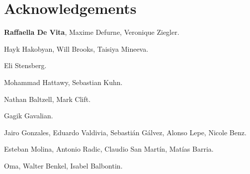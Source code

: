 \section*{Acknowledgements}
    \textbf{Raffaella De Vita}, Maxime Defurne, Veronique Ziegler.

    Hayk Hakobyan, Will Brooks, Taisiya Mineeva.

    Eli Stensberg.

    Mohammad Hattawy, Sebastian Kuhn.

    Nathan Baltzell, Mark Clift.

    Gagik Gavalian.

    Jairo Gonzales, Eduardo Valdivia, Sebastián Gálvez, Alonso Lepe, Nicole Benz.

    Esteban Molina, Antonio Radic, Claudio San Martín, Matías Barria.

    Oma, Walter Benkel, Isabel Balbontin.
